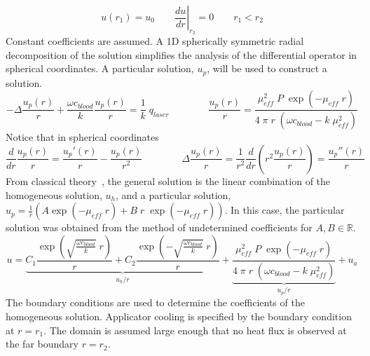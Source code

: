 \documentclass{article}         %
\theoremstyle{definition}
\theoremstyle{remark}
\begin{document}
\[
   u(r_1) = u_0
  \qquad
  \left. \frac{d u}{dr} \right|_{r_2}  = 0
  \qquad
   r_1 < r_2
\]
Constant coefficients are assumed. A 1D spherically symmetric radial decomposition 
of the solution
simplifies the analysis of the differential operator in spherical coordinates.
A particular solution, $u_p$, will be used to construct a solution. 
\[
 -\Delta  \frac{u_p(r)}{r} 
 + \frac{\omega c_\textit{blood}}{k}  \frac{u_p(r)}{r} 
 = \frac{1}{k} \; q_\textit{laser}
\qquad
\qquad
  \frac{u_p(r)}{r}  = 
    \frac{\mu_\textit{eff}^2 \; P \; \exp \left(-\mu_\textit{eff} \; r \right) }
         { 4 \; \pi \; r \; \left(\omega c_\textit{blood}-k \; \mu_\textit{eff}^2 \right)} 
\]
Notice that in spherical coordinates
\[
  \frac{d}{dr}  \frac{u_p(r)}{r} 
   = 
    \frac{u_p'(r)}{r}  - \frac{u_p(r)}{r^2}   
  \qquad
  \qquad
 \Delta  \frac{u_p(r)}{r} 
   = 
  \frac{1}{r^2} 
  \frac{d}{dr} \left( r^2 \frac{u_p(r)}{r}  \right)
   = 
    \frac{u_p''(r)}{r} 
\]
From classical theory~\cite{boyce1992elementary}, 
the general solution is the linear combination of the homogeneous solution, $u_h$, and
a particular solution, 
$ u_p = \frac{1}{r} \left( A \exp (-\mu_\textit{eff} \; r) + B \; r \;  \exp
(-\mu_\textit{eff} \; r) \right) $.
In this case, the particular solution was obtained from the method of undetermined
coefficients for $A,B \in \mathbb{R}$. 
\begin{equation}\label{OneDSolution}
u = 
  \underbrace{
    C_1 \frac{\exp\left( \sqrt{\frac{\omega c_\textit{blood}}{k}} \; r \right)}{r}  
  + 
    C_2 \frac{\exp\left(-\sqrt{\frac{\omega c_\textit{blood}}{k}} \; r \right)}{r}  
    }_{u_h / r}
  + 
  \underbrace{
    \frac{\mu_\textit{eff}^2 \; P \; \exp \left(-\mu_\textit{eff} \; r \right) }
         { 4 \; \pi \; r \; \left(\omega c_\textit{blood}-k \; \mu_\textit{eff}^2 \right)} 
    }_{u_p / r}
  + 
    u_a
\end{equation}
The boundary conditions are used to determine the coefficients of the homogeneous solution.
Applicator cooling is specified by the boundary condition at $r = r_1$.
The domain is assumed large enough that no heat flux is observed at the far boundary $r = r_2$.
\end{document}
